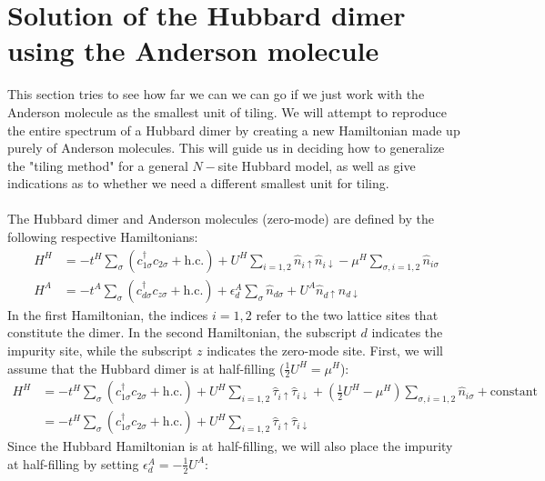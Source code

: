 \documentclass{report}
\numberwithin{equation}{section}
\begin{document}
\section{Solution of the Hubbard dimer using the Anderson molecule}
This section tries to see how far we can we can go if we just work with the Anderson molecule as the smallest unit of tiling. We will attempt to reproduce the entire spectrum of a Hubbard dimer by creating a new Hamiltonian made up purely of Anderson molecules. This will guide us in deciding how to generalize the "tiling method" for a general $N-$site Hubbard model, as well as give indications as to whether we need a different smallest unit for tiling.
\\\\
The Hubbard dimer and Anderson molecules (zero-mode) are defined by the following respective Hamiltonians:
\begin{equation}\begin{aligned}
	H^H &= -t^H\sum_{\sigma}\left(c^\dagger_{1\sigma}c_{2\sigma} + \text{h.c.}\right) + U^H\sum_{i=1,2}\hat n_{i \uparrow}\hat n_{i \downarrow} - \mu^H \sum_{\sigma, i=1,2}\hat n_{i\sigma}\\
	H^A &= -t^A\sum_{\sigma}\left(c^\dagger_{d\sigma}c_{z\sigma} + \text{h.c.}\right) + \epsilon_d^A \sum_{\sigma}\hat n_{d\sigma} + U^A\hat n_{d \uparrow}\hat n_{d \downarrow}
\end{aligned}\end{equation}
In the first Hamiltonian, the indices \(i=1,2\) refer to the two lattice sites that constitute the dimer. In the second Hamiltonian, the subscript \(d\) indicates the impurity site, while the subscript \(z\) indicates the zero-mode site. First, we will assume that the Hubbard dimer is at half-filling (\(\frac{1}{2}U^H = \mu^H\)):
\begin{equation}\begin{aligned}
	\label{hubb_dimer}
	H^H &= -t^H\sum_{\sigma}\left(c^\dagger_{1\sigma}c_{2\sigma} + \text{h.c.}\right) + U^H\sum_{i=1,2}\hat \tau_{i \uparrow}\hat \tau_{i \downarrow} + \left(\frac{1}{2}U^H- \mu^H\right) \sum_{\sigma, i=1,2}\hat n_{i\sigma} + \text{constant}\\
	    &= -t^H\sum_{\sigma}\left(c^\dagger_{1\sigma}c_{2\sigma} + \text{h.c.}\right) + U^H\sum_{i=1,2}\hat \tau_{i \uparrow}\hat \tau_{i \downarrow}
\end{aligned}\end{equation}
Since the Hubbard Hamiltonian is at half-filling, we will also place the impurity at half-filling by setting \(\epsilon_d^A = -\frac{1}{2}U^A\):
\end{document}
